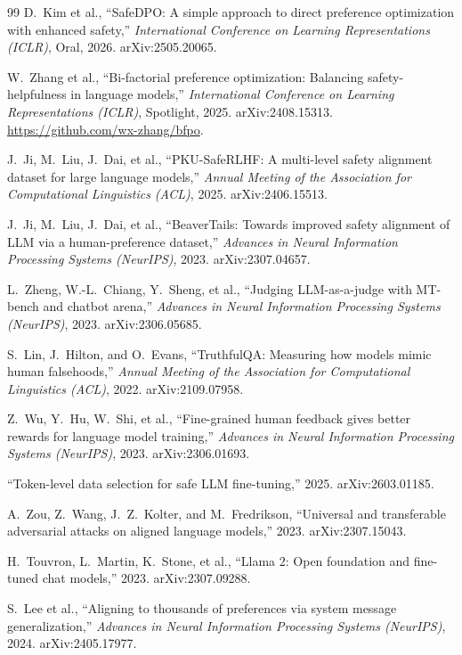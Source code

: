 \documentclass[12pt,a4paper,UTF8]{ctexart}
\begin{document}
\begin{thebibliography}{99}
D.~Kim et al.,
``SafeDPO: A simple approach to direct preference optimization with enhanced safety,''
\textit{International Conference on Learning Representations (ICLR)}, Oral,
2026. arXiv:2505.20065.

W.~Zhang et al.,
``Bi-factorial preference optimization: Balancing safety-helpfulness in language models,''
\textit{International Conference on Learning Representations (ICLR)}, Spotlight,
2025. arXiv:2408.15313. \url{https://github.com/wx-zhang/bfpo}.

J.~Ji, M.~Liu, J.~Dai, et al.,
``PKU-SafeRLHF: A multi-level safety alignment dataset for large language models,''
\textit{Annual Meeting of the Association for Computational Linguistics (ACL)},
2025. arXiv:2406.15513.

J.~Ji, M.~Liu, J.~Dai, et al.,
``BeaverTails: Towards improved safety alignment of LLM via a human-preference dataset,''
\textit{Advances in Neural Information Processing Systems (NeurIPS)},
2023. arXiv:2307.04657.

L.~Zheng, W.-L.~Chiang, Y.~Sheng, et al.,
``Judging LLM-as-a-judge with MT-bench and chatbot arena,''
\textit{Advances in Neural Information Processing Systems (NeurIPS)},
2023. arXiv:2306.05685.

S.~Lin, J.~Hilton, and O.~Evans,
``TruthfulQA: Measuring how models mimic human falsehoods,''
\textit{Annual Meeting of the Association for Computational Linguistics (ACL)},
2022. arXiv:2109.07958.

Z.~Wu, Y.~Hu, W.~Shi, et al.,
``Fine-grained human feedback gives better rewards for language model training,''
\textit{Advances in Neural Information Processing Systems (NeurIPS)},
2023. arXiv:2306.01693.

``Token-level data selection for safe LLM fine-tuning,''
2025. arXiv:2603.01185.

A.~Zou, Z.~Wang, J.~Z.~Kolter, and M.~Fredrikson,
``Universal and transferable adversarial attacks on aligned language models,''
2023. arXiv:2307.15043.

H.~Touvron, L.~Martin, K.~Stone, et al.,
``Llama 2: Open foundation and fine-tuned chat models,''
2023. arXiv:2307.09288.

S.~Lee et al.,
``Aligning to thousands of preferences via system message generalization,''
\textit{Advances in Neural Information Processing Systems (NeurIPS)},
2024. arXiv:2405.17977.


\end{thebibliography}
\end{document}
